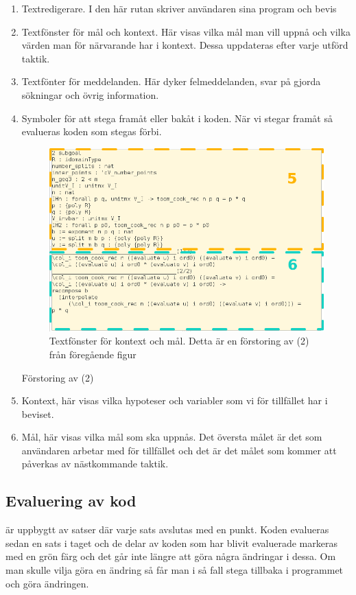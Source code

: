 \begin{enumerate}
\item Textredigerare. I den här rutan skriver användaren sina program och bevis
\item Textfönster för mål och kontext. Här visas vilka mål man vill uppnå och
  vilka värden man för närvarande har i kontext. Dessa uppdateras efter varje
  utförd taktik.
\item Textfönter för meddelanden. Här dyker felmeddelanden, svar på
  gjorda sökningar och övrig information.
\item Symboler för att stega framåt eller bakåt i koden. När vi stegar framåt
  så evalueras koden som stegas förbi.


\begin{figure}[H]
  \centering
  \includegraphics[width=150mm]{images/Kontext}
  \caption[Fönster för kontext och mål]
   {Textfönster för kontext och mål. Detta är en förstoring av (2) från
     föregående figur}
\end{figure}

Förstoring av (2)
\item Kontext, här visas vilka hypoteser och variabler som vi för tillfället
  har i beviset.
\item Mål, här visas vilka mål som ska uppnås. Det översta målet är det som
  användaren arbetar med för tillfället och det är det målet som kommer att
  påverkas av nästkommande taktik.
\end{enumerate}

\subsection{Evaluering av kod}
\coq är uppbygtt av satser där varje sats avslutas med en punkt. Koden
evalueras sedan en sats i taget och de delar av koden som har blivit evaluerade
markeras med en grön färg och det går inte längre att göra några ändringar i
dessa. Om man skulle vilja göra en ändring så får man i så fall stega tillbaka
i programmet och göra ändringen.

